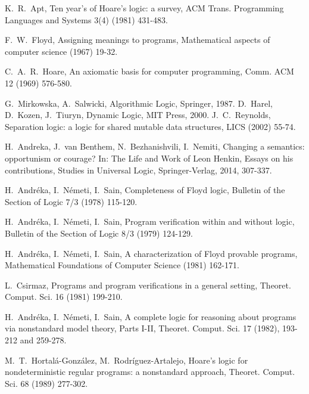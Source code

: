 \documentclass[a4paper,11pt]{article}
\begin{document}
\begin{thebibliography}{99}
K.~R.~Apt,
\newblock Ten year's of Hoare's logic: a survey,
\newblock ACM Trans. Programming Languages and Systems 3(4) (1981) 431-483.

F.~W.~Floyd,
\newblock Assigning meanings to programs,
\newblock Mathematical aspects of computer science (1967) 19-32.

C.~A.~R.~Hoare,
\newblock An axiomatic basis for computer programming,
\newblock Comm. ACM 12 (1969) 576-580.

G.~Mirkowska, A.~Salwicki,
\newblock Algorithmic Logic,
\newblock Springer, 1987.
D.~Harel, D.~Kozen, J.~Tiuryn,
\newblock Dynamic Logic,
\newblock  MIT Press, 2000.
J.~C.~Reynolds,
\newblock Separation logic: a logic for shared mutable data structures,
\newblock LICS (2002) 55-74.

H.~Andreka, J.~van Benthem, N.~Bezhanishvili, I.~Nemiti,
\newblock Changing a semantics: opportunism or courage?
\newblock In: The Life and Work of Leon Henkin, Essays on his contributions, Studies in Universal Logic, Springer-Verlag, 2014, 307-337.

H.~Andr\'{e}ka, I.~N\'{e}meti, I.~Sain,
\newblock Completeness of Floyd logic,
\newblock Bulletin of the Section of Logic 7/3 (1978) 115-120.

H.~Andr\'{e}ka, I.~N\'{e}meti, I.~Sain,
\newblock Program verification within and without logic,
\newblock Bulletin of the Section of Logic 8/3 (1979) 124-129.

H.~Andr\'{e}ka, I.~N\'{e}meti, I.~Sain,
\newblock A characterization of Floyd provable programs,
\newblock Mathematical Foundations of Computer Science (1981) 162-171.

L.~Csirmaz,
\newblock Programs and program verifications in a general setting,
\newblock Theoret. Comput. Sci. 16 (1981) 199-210.

H.~Andr\'{e}ka, I.~N\'{e}meti, I.~Sain,
\newblock A complete logic for reasoning about programs via nonstandard model theory, Parts I-II,
\newblock Theoret. Comput. Sci. 17 (1982), 193-212 and 259-278.

M.~T.~Hortal\'{a}-Gonz\'{a}lez, M.~Rodr\'{i}guez-Artalejo,
\newblock Hoare's logic for nondeterministic regular programs: a nonstandard approach,
\newblock Theoret. Comput. Sci. 68 (1989) 277-302.


\end{thebibliography}
\end{document}
